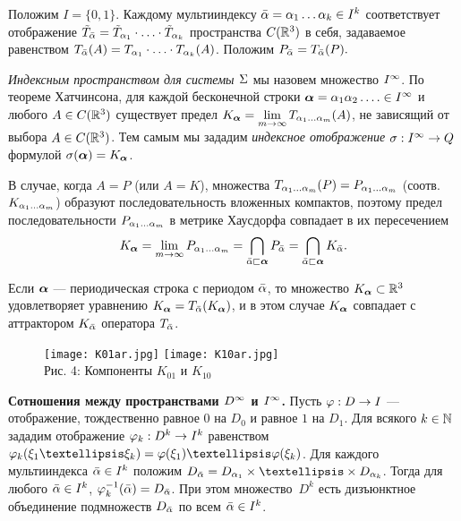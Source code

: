 Положим $I=\{0,1\}$. 
Каждому мультииндексу ${\bar{\alpha}}=\alpha_1\ldots\alpha_k\in I^k$  соответствует отображение $\tilde T_{\bar{\alpha}}={\tilde T}_{\alpha_1}\cdot\ldots\cdot{\tilde T}_{\alpha_k}$ пространства $C(\mathbb{R}^3)$ в себя, задаваемое равенством $ T_{\bar{\alpha}}(A)=T_{\alpha_1}\cdot\ldots\cdot T_{\alpha_k}(A)$. 
Положим $P_{\bar{\alpha}}=T_{\bar{\alpha}}(P).$

{\em Индексным пространством для системы $\Sigma$} мы назовем множество $I^\infty$. 
По теореме Хатчинсона, для каждой бесконечной строки ${\bm{\alpha}}=\alpha_1\alpha_2\ldots.\in I^\infty$  и любого $A\in C(\mathbb{R}^3)$ существует предел $K_{\bm{\alpha}}=\lim\limits_{m\to\infty}T_{\alpha_1\ldots\alpha_m}(A)$, не зависящий от выбора   $A\in C(\mathbb{R}^3)$. 
Тем самым  мы зададим {\em индексное отображение} $\sigma:I^\infty\to Q$ формулой $\sigma({\bm{\alpha}})=K_{\bm{\alpha}}$.

В случае, когда $A=P$ (или $A=K$), множества $T_{\alpha_1\ldots\alpha_m}(P)=P_{\alpha_1\ldots\alpha_m}$ (соотв. $K_{\alpha_1\ldots\alpha_m}$) образуют последовательность вложенных компактов, поэтому предел последовательности $P_{\alpha_1\ldots\alpha_m}$ в метрике Хаусдорфа совпадает в их пересечением
\begin{equation}\label{sigma} 
K_{\bm{\alpha}}=\lim\limits_{m\to\infty}P_{\alpha_1\ldots\alpha_m}=\bigcap\limits_{{\bar{\alpha}}\sqsubset {\bm{\alpha}}}P_{\bar{\alpha}}=\bigcap\limits_{{\bar{\alpha}}\sqsubset {\bm{\alpha}}}K_{\bar{\alpha}}.
\end{equation}

Если ${\bm{\alpha}}$ --- периодическая строка с периодом $\bar{\alpha}$, то множество $K_{\bm{\alpha}}\subset \mathbb{R}^3$ удовлетворяет уравнению $K_{\bm{\alpha}}=T_{\bar{\alpha}}(K_{\bm{\alpha}})$, и  в этом случае $K_{\bm{\alpha}}$ совпадает с аттрактором  $K_{\bar{\alpha}}$ оператора  $T_{\bar{\alpha}}$.


\begin{figure}[H]
\begin{center}
\qquad\qquad
\texttt{[image: K01ar.jpg]}
\hfill
\texttt{[image: K10ar.jpg]}\qquad\qquad\\
[1ex]
{\footnotesize Рис. 4: Компоненты $K_{01}$ и $K_{10}$}
\end{center}\end{figure}


{\bf Сотношения между пространствами $D^\infty$ и $I^\infty$.} Пусть $\varphi:D\to I$  ---  отображение, тождественно равное $0$ на   $D_0$ и равное $1$ на $D_1$. 
Для всякого $k\in\mathbb{N}$ зададим отображение $\varphi_k:D^k\to I^k$ равенством $\fy_k(\xi_1…\xi_k)=\fy(\xi_1)…\fy(\xi_k)$.
Для каждого мультииндекса  ${\bar{\alpha}}\in I^k$ положим $D_\bal=D_{\al_1}\times…\times D_{\al_k}$. 
Тогда для любого ${\bar{\alpha}}\in I^k$, $ \varphi_k^{-1}({\bar{\alpha}})=D_{\bar{\alpha}}$.
При этом множество~$D^k$ есть дизъюнктное объединение подмножеств $D_{\bar{\alpha}}$ по всем ${\bar{\alpha}}\in I^k$.

